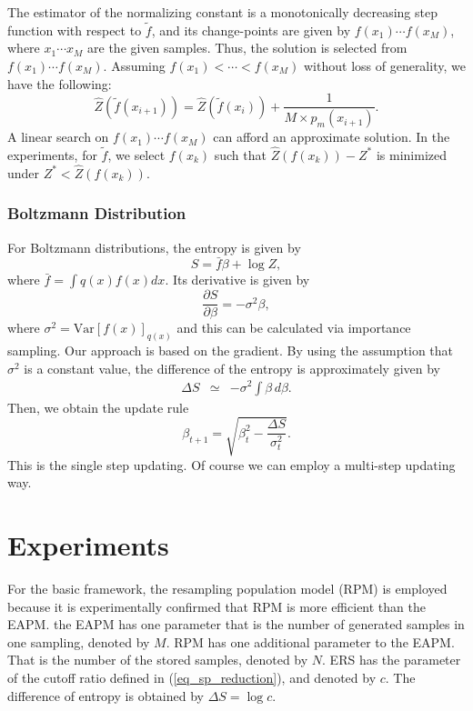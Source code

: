 The estimator of the normalizing constant is
a monotonically decreasing step function with respect to $\tilde f$,
and its change-points are given by $f(x_1) \cdots f(x_M)$, 
where $x_1 \cdots x_M$ are the given samples.
Thus, the solution is selected from $f(x_1) \cdots f(x_M)$.
Assuming \mbox{$f(x_1) < \cdots <f(x_M)$} without loss of generality,
we have the following:
\begin{equation}
\hat Z(\tilde f(x_{i+1}))=\hat Z(\tilde f(x_{i}))+\frac{1}{M \times p_m(x_{i+1})}.
\end{equation}
A linear search on $f(x_1) \cdots f(x_M)$
can afford an approximate solution.
In the experiments,
for $\tilde f$, we select $f(x_k)$
such that $\hat Z(f(x_k))-Z^*$ is minimized
under $Z^*<\hat Z(f(x_k))$.


\subsubsection{Boltzmann Distribution}
For Boltzmann distributions,
the entropy is given by
\begin{equation}
 S= \bar f \beta + \log Z,
\end{equation}
where $\bar f=\int q(x) f(x) dx$.
Its derivative is given by
\begin{equation}
 \frac{\partial S}{\partial \beta}= - \sigma^2 \beta,
\end{equation}
where $\sigma^2=\mathrm{Var}[f(x)]_{q(x)}$ and this can be
calculated via importance sampling.
Our approach is based on the gradient.
By using the assumption that $\sigma^2$ is a constant value,
the difference of the entropy is approximately given by
\begin{eqnarray}
 \Delta S &\simeq& - \sigma ^2 \int \beta \, d\beta.
\end{eqnarray}
Then, we obtain the update rule
\begin{equation}
 \beta_{t+1}=\sqrt{\beta_t^2 - \frac{\Delta S}{\sigma_t^2}}.
\end{equation}
This is the single step updating.
Of course we can employ a multi-step updating way.


\section{Experiments}
For the basic framework,
the resampling population model (RPM) \cite{higo:rpm} is employed
because it is experimentally confirmed that RPM is more efficient than
the EAPM.
the EAPM has one parameter that is
the number of generated samples in one sampling, denoted by $M$.
RPM has one additional parameter to the EAPM.
That is the number of the stored samples, denoted by $N$.
ERS has the parameter of the cutoff ratio defined in
(\ref{eq_sp_reduction}), and denoted by $c$.
The difference of entropy is obtained by $\Delta S = \log c$.




